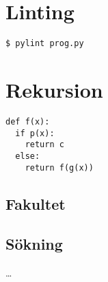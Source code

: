 \mode*

\section{Linting}

\begin{frame}[fragile]
  \begin{lstlisting}[numbers=none,basicstyle=\huge]
$ pylint prog.py
  \end{lstlisting}
\end{frame}

\section{Rekursion}

\begin{frame}[fragile]
  \begin{lstlisting}[basicstyle=\huge,numbers=none]
def f(x):
  if p(x):
    return c
  else:
    return f(g(x))
  \end{lstlisting}
\end{frame}

\subsection{Fakultet}

\begin{frame}[fragile]
  \begin{example}
    
  \end{example}
\end{frame}

\begin{frame}[fragile]
  \begin{example}
    
  \end{example}
\end{frame}

\subsection{Sökning}

\begin{frame}[fragile]
  \begin{example}
    
  \end{example}
\end{frame}

\begin{frame}[fragile]
  \begin{example}
    
    \dots
    
  \end{example}
\end{frame}



